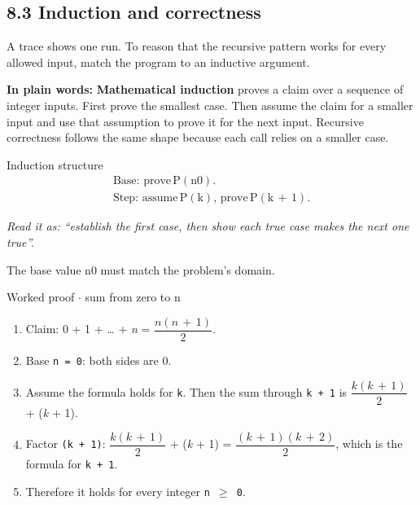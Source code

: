 \documentclass[11pt]{article}
\begin{document}
\begin{keepsection}
\section{8.3 Induction and correctness}

A trace shows one run. To reason that the recursive pattern works for every allowed input, match the program to an inductive argument.

\begin{plainbox}\textbf{In plain words:} \textbf{Mathematical induction} proves a claim over a sequence of integer inputs. First prove the smallest case. Then assume the claim for a smaller input and use that assumption to prove it for the next input. Recursive correctness follows the same shape because each call relies on a smaller case.\end{plainbox}

\begin{equationcard}{Induction structure}
\[ \begin{gathered} \text{Base}:\, \text{prove}\, \mathrm{P}(\mathrm{n}0). \\ \text{Step}:\, \text{assume}\, \mathrm{P}(\mathrm{k}),\, \text{prove}\, \mathrm{P}(\mathrm{k}\, +\, 1). \end{gathered} \]
{\small \emph{Read it as: “establish the first case, then show each true case makes the next one true”.}\par  The base value n0 must match the problem’s domain.}
\end{equationcard}

\begin{workedbox}{Worked proof \ensuremath{\cdot} sum from zero to n}
\begin{enumerate}
\item Claim: 0 + 1 + … + \textit{n} = {\small\ensuremath{\dfrac{{n}({n}\, +\, 1)}{2}}}.
\item Base \texttt{n = 0}: both sides are 0.
\item Assume the formula holds for \texttt{k}. Then the sum through \texttt{k + 1} is {\small\ensuremath{\dfrac{{k}({k}\, +\, 1)}{2}}} + (\textit{k} + 1).
\item Factor \texttt{(k + 1)}: {\small\ensuremath{\dfrac{{k}({k}\, +\, 1)}{2}}} + (\textit{k} + 1) = {\small\ensuremath{\dfrac{({k}\, +\, 1)({k}\, +\, 2)}{2}}}, which is the formula for \texttt{k + 1}.
\item Therefore it holds for every integer \texttt{n \ensuremath{\geq} 0}.
\end{enumerate}
\end{workedbox}


\end{keepsection}
\end{document}
